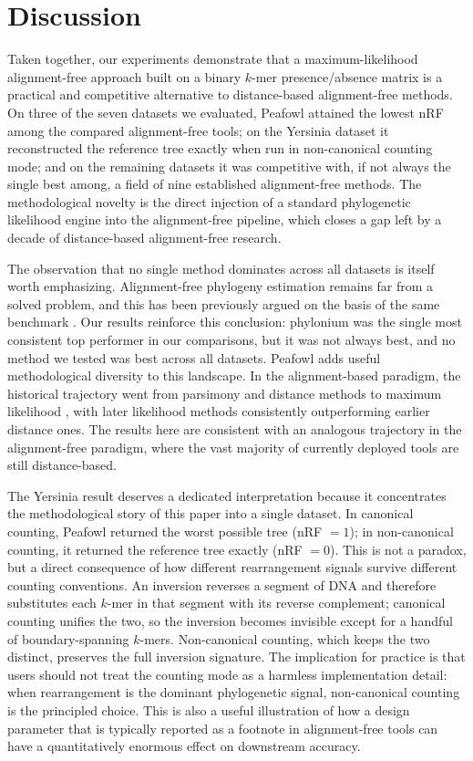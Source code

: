 \documentclass[11pt]{article}
\begin{document}
\section{Discussion}

Taken together, our experiments demonstrate that a maximum-likelihood
alignment-free approach built on a binary $k$-mer presence/absence matrix
is a practical and competitive alternative to distance-based alignment-free
methods. On three of the seven datasets we evaluated, Peafowl attained the
lowest nRF among the compared alignment-free tools; on the Yersinia dataset
it reconstructed the reference tree exactly when run in non-canonical
counting mode; and on the remaining datasets it was competitive with, if
not always the single best among, a field of nine established alignment-free
methods. The methodological novelty is the direct injection of a standard
phylogenetic likelihood engine \citep{stamatakis2014raxml} into the
alignment-free pipeline, which closes a gap left by a decade of
distance-based alignment-free research.

The observation that no single method dominates across all datasets is
itself worth emphasizing. Alignment-free phylogeny estimation remains far
from a solved problem, and this has been previously argued on the basis of
the same benchmark \citep{zielezinski2019afproject}. Our results reinforce
this conclusion: phylonium was the single most consistent top performer in
our comparisons, but it was not always best, and no method we tested was
best across all datasets. Peafowl adds useful methodological diversity to
this landscape. In the alignment-based paradigm, the historical trajectory
went from parsimony \citep{fitch1971parsimony} and distance methods
\citep{saitou1987nj} to maximum likelihood
\citep{felsenstein1981ml, posada2021felsenstein}, with later likelihood
methods consistently outperforming earlier distance ones. The results here
are consistent with an analogous trajectory in the alignment-free paradigm,
where the vast majority of currently deployed tools are still distance-based.

The Yersinia result deserves a dedicated interpretation because it
concentrates the methodological story of this paper into a single dataset.
In canonical counting, Peafowl returned the worst possible tree
(nRF $= 1$); in non-canonical counting, it returned the reference tree
exactly (nRF $= 0$).
This is not a paradox, but a direct consequence of how different
rearrangement signals survive different counting conventions. An inversion
reverses a segment of DNA and therefore substitutes each $k$-mer in that
segment with its reverse complement; canonical counting unifies the two,
so the inversion becomes invisible except for a handful of boundary-spanning
$k$-mers. Non-canonical counting, which keeps the two distinct, preserves
the full inversion signature. The implication for practice is that users
should not treat the counting mode as a harmless implementation detail:
when rearrangement is the dominant phylogenetic signal, non-canonical
counting is the principled choice. This is also a useful illustration of
how a design parameter that is typically reported as a footnote in
alignment-free tools can have a quantitatively enormous effect on
downstream accuracy.
\end{document}
